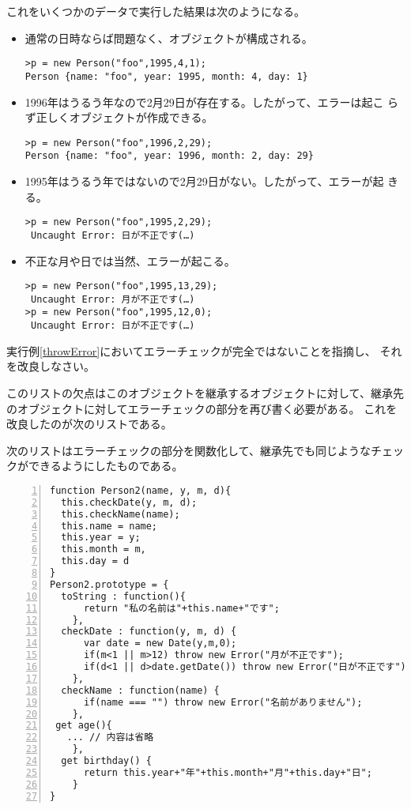 これをいくつかのデータで実行した結果は次のようになる。
\begin{itemize}
 \item 通常の日時ならば問題なく、オブジェクトが構成される。
\begin{Verbatim}
>p = new Person("foo",1995,4,1);
Person {name: "foo", year: 1995, month: 4, day: 1}
\end{Verbatim}
 \item 1996年はうるう年なので2月29日が存在する。したがって、エラーは起こ
			 らず正しくオブジェクトが作成できる。
\begin{Verbatim}
>p = new Person("foo",1996,2,29);
Person {name: "foo", year: 1996, month: 2, day: 29}
\end{Verbatim}
 \item 1995年はうるう年ではないので2月29日がない。したがって、エラーが起
			 きる。
\begin{Verbatim}
>p = new Person("foo",1995,2,29);
 Uncaught Error: 日が不正です(…)
\end{Verbatim}
 \item 不正な月や日では当然、エラーが起こる。
\begin{Verbatim}
>p = new Person("foo",1995,13,29);
 Uncaught Error: 月が不正です(…)
>p = new Person("foo",1995,12,0);
 Uncaught Error: 日が不正です(…)
\end{Verbatim}
\end{itemize}
\begin{Prob}\upshape\label{CorrectErrorCheck}
 実行例\ref{throwError}においてエラーチェックが完全ではないことを指摘し、
 それを改良しなさい。
\end{Prob}
このリストの欠点はこのオブジェクトを継承するオブジェクトに対して、継承先
のオブジェクトに対してエラーチェックの部分を再び書く必要がある。
これを改良したのが次のリストである。
\begin{Exec}\upshape\label{Error2}
次のリストはエラーチェックの部分を関数化して、継承先でも同じようなチェッ
 クができるようにしたものである。
\begin{Verbatim}[numbers=left]
function Person2(name, y, m, d){
  this.checkDate(y, m, d);
  this.checkName(name);
  this.name = name;
  this.year = y;
  this.month = m,
  this.day = d
}
Person2.prototype = {
  toString : function(){
      return "私の名前は"+this.name+"です";
    },
  checkDate : function(y, m, d) {
      var date = new Date(y,m,0);
      if(m<1 || m>12) throw new Error("月が不正です");
      if(d<1 || d>date.getDate()) throw new Error("日が不正です");
    },
  checkName : function(name) {
      if(name === "") throw new Error("名前がありません");
    },
 get age(){
   ... // 内容は省略
    },
  get birthday() {
      return this.year+"年"+this.month+"月"+this.day+"日";
    }
}
\end{Verbatim}
 \end{Exec}

